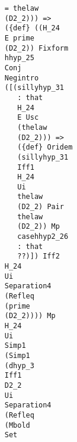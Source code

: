 \documentclass[12pt]{article}
\begin{document}
\begin{verbatim}
                                                 = thelaw 
                                                 (D2_2))) => 
                                                 ({def} ((H_24 
                                                 E prime 
                                                 (D2_2)) Fixform 
                                                 hhyp_25 
                                                 Conj 
                                                 Negintro 
                                                 ([(sillyhyp_31 
                                                    : that 
                                                    H_24 
                                                    E Usc 
                                                    (thelaw 
                                                    (D2_2))) => 
                                                    ({def} Oridem 
                                                    (sillyhyp_31 
                                                    Iff1 
                                                    H_24 
                                                    Ui 
                                                    thelaw 
                                                    (D2_2) Pair 
                                                    thelaw 
                                                    (D2_2)) Mp 
                                                    casehhyp2_26 
                                                    : that 
                                                    ??)]) Iff2 
                                                 H_24 
                                                 Ui 
                                                 Separation4 
                                                 (Refleq 
                                                 (prime 
                                                 (D2_2)))) Mp 
                                                 H_24 
                                                 Ui 
                                                 Simp1 
                                                 (Simp1 
                                                 (dhyp_3 
                                                 Iff1 
                                                 D2_2 
                                                 Ui 
                                                 Separation4 
                                                 (Refleq 
                                                 (Mbold 
                                                 Set 

\end{verbatim}
\end{document}
